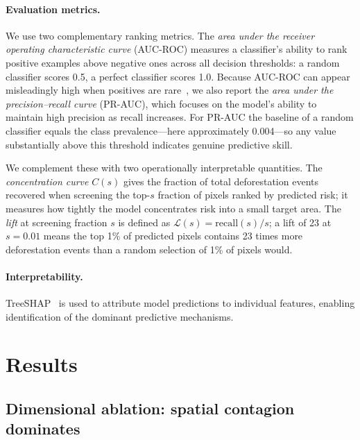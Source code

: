\documentclass{iopart}
\begin{document}
\paragraph{Evaluation metrics.}
We use two complementary ranking metrics.
The \emph{area under the receiver operating characteristic curve}
(AUC-ROC) measures a classifier's ability to rank positive
examples above negative ones across all decision thresholds:
a random classifier scores 0.5, a perfect classifier scores 1.0.
Because AUC-ROC can appear misleadingly high when positives are
rare~\cite{Mayfield2017}, we also report the \emph{area under
the precision--recall curve} (PR-AUC), which focuses on the
model's ability to maintain high precision as recall increases.
For PR-AUC the baseline of a random classifier equals the class
prevalence---here approximately 0.004---so any value substantially
above this threshold indicates genuine predictive skill.

We complement these with two operationally interpretable quantities.
The \emph{concentration curve} $C(s)$ gives the fraction
of total deforestation events recovered when screening the
top-$s$ fraction of pixels ranked by predicted risk;
it measures how tightly the model concentrates risk into a
small target area.
The \emph{lift} at screening fraction $s$ is defined as
$\mathcal{L}(s) = \mathrm{recall}(s)/s$;
a lift of 23 at $s=0.01$ means the top 1\% of predicted pixels
contains 23 times more deforestation events than a random
selection of 1\% of pixels would.

\paragraph{Interpretability.}
TreeSHAP~\cite{Lundberg2017, Lundberg2020} is used to attribute
model predictions to individual features, enabling identification
of the dominant predictive mechanisms.


\section{Results}

\subsection{Dimensional ablation: spatial contagion dominates}
\end{document}
